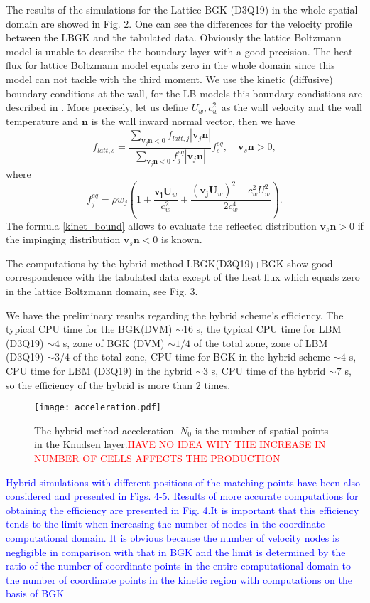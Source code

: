 \documentclass[]{elsarticle} %
\begin{document}
{The results of the simulations for the Lattice BGK  (D3Q19) in the whole spatial domain are showed in Fig. 2. One can see the differences for the velocity profile between the LBGK and the tabulated data. Obviously the lattice Boltzmann  model is  unable to describe  the  boundary layer with a good precision.
The  heat flux for lattice Boltzmann model equals zero in the whole domain since this model can not tackle with the third  moment.   We use  the  kinetic (diffusive) boundary conditions at the wall, for the LB models  this boundary condistions are described in
\cite{ansumali2002}. More  precisely, let us define $U_w, c_w^2$  as the wall velocity and  the wall temperature and $\mathbf{n}$ is  the wall inward normal vector, then we  have
\begin{equation}\label{kinet_bound}
f_{latt, s}=
\frac{\sum_{\mathbf{v}_j\mathbf{n}<0} f_{latt,j}|\mathbf{v}_j\mathbf{n}|}{\sum_{\mathbf{v}_j\mathbf{n}<0}
f^{eq}_j|\mathbf{v}_j\mathbf{n}|}f^{eq}_s, \quad  \mathbf{v}_s \mathbf{n}>0,
\end{equation}
where
$$
f^{eq}_{j}=\rho w_j\left(1+ \frac{\mathbf{v_j}\mathbf{U}_w}{c_w^2}+\frac{(\mathbf{v_j}\mathbf{U}_w)^2-c_w^2U_w^2}{2c_w^4}\right).
$$
 The formula  \eqref{kinet_bound}  allows to evaluate  the reflected distribution $\mathbf{v}_s\mathbf{n}>0$ if the  impinging distribution $\mathbf{v}_s\mathbf{n}<0$ is  known.

 The computations by the hybrid method LBGK(D3Q19)+BGK show good correspondence with the tabulated data except of the heat flux which equals zero in the lattice Boltzmann domain, see Fig. 3.

We have the preliminary results regarding the hybrid scheme’s efficiency. The typical CPU time for the BGK(DVM) $\sim 16$ s, the typical CPU time for LBM (D3Q19) $\sim 4$ s, zone of BGK (DVM) $\sim 1/4$ of the total zone, zone of LBM (D3Q19) $\sim 3/4 $ of the total zone, CPU time for BGK in the hybrid scheme $\sim 4$ s, CPU time for LBM (D3Q19) in the hybrid $\sim 3$ s, CPU time of the hybrid $\sim 7$ s, so the efficiency of the hybrid is more than $2$ times.

\begin{figure}[!h]
\centering
\texttt{[image: acceleration.pdf]}
\caption{The hybrid method acceleration. $N_0$ is the number of spatial points in the Knudsen layer.\textcolor{red}{HAVE  NO IDEA  WHY THE INCREASE IN NUMBER  OF CELLS AFFECTS THE PRODUCTION}}
\end{figure}

\textcolor{blue} {Hybrid simulations with different positions of the matching points have been also considered and presented in Figs. 4-5.}
\textcolor{blue} {Results of more accurate computations for obtaining the efficiency are presented in Fig. 4.It is important that this efficiency tends to the limit when increasing the number of nodes in the coordinate computational domain. It is obvious because the number of velocity nodes is negligible in comparison with that in BGK and the limit is determined by the ratio of the number of coordinate points in the entire computational domain to the number of coordinate points in the kinetic region with computations on the basis of BGK}

}
\end{document}

